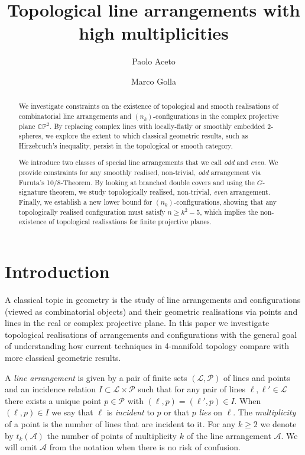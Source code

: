 \documentclass[a4paper,12pt, onesided]{amsart}
\title{Topological line arrangements with high multiplicities}
\author{Paolo Aceto}
\author{Marco Golla}
\date{}
\theoremstyle{remark}
\numberwithin{figure}{section}
\numberwithin{equation}{section}
\newcommand{\A}{\mathcal{A}}
\begin{document}
\begin{abstract}
We investigate constraints on the existence of topological and smooth realisations of combinatorial line arrangements and $(n_k)$-configurations in the complex projective plane $\mathbb{CP}^2$. By replacing complex lines with locally-flatly or smoothly embedded 2-spheres, we explore the extent to which classical geometric results, such as Hirzebruch's inequality, persist in the topological or smooth category.

   We introduce two classes of special line arrangements that we call \emph{odd} and \emph{even}. 
   We provide constraints for any smoothly realised, non-trivial, \emph{odd} arrangement via Furuta's 10/8-Theorem.  By looking at branched double covers and using the $G$-signature theorem, we study topologically realised, non-trivial, \emph{even} arrangement. Finally, we establish a new lower bound for $(n_k)$-configurations, showing that any topologically realised configuration must satisfy $n \geq k^2-5$, which implies the non-existence of topological realisations for finite projective planes. 
\end{abstract}


\maketitle


\section{Introduction}
A classical topic in geometry is the study of line arrangements and configurations (viewed as combinatorial objects) and their geometric realisations via points and lines in the real or complex projective plane. In this paper we investigate topological realisations of arrangements and configurations with the general goal of understanding how current techniques in 4-manifold topology compare with more classical geometric results.

A \emph{line arrangement} is given by a pair of finite sets $(\mathcal{L},\mathcal{P})$ of lines and points and an incidence relation 
$I\subset\mathcal{L}\times\mathcal P$ such that for any pair of lines $\ell,\ell'\in\mathcal{L}$ there exists a unique point $p\in\mathcal{P}$ with $(\ell,p)=(\ell',p)\in I$. When $(\ell,p)\in I$ we say that $\ell$ is \emph{incident} to $p$ or that $p$ \emph{lies} on $\ell$. The \emph{multiplicity} of a point is the number of lines that are incident to it. For any $k\geq 2$ we denote by $t_k(\A)$ the number of points of multiplicity $k$ of the line arrangement $\A$. We will omit $\A$ from the notation when there is no risk of confusion.
\end{document}
